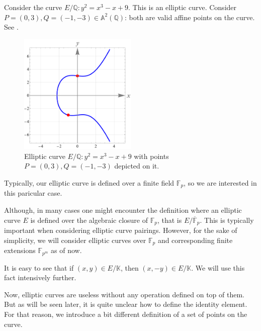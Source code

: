 \documentclass[../lecture-notes.tex]{subfiles}
\begin{document}
\begin{example}
    Consider the curve $E/\mathbb{Q}: y^2=x^3-x+9$. This is an elliptic curve. Consider $P=(0,3), Q=(-1,-3) \in \mathbb{A}^2(\mathbb{Q})$: both are valid affine points on the curve. See .

    \begin{figure}[H]
        \centering
        \includegraphics[width=0.5\textwidth]{images/lecture_3/ec_illustration_1.pdf}
        \caption{Elliptic curve $E/\mathbb{Q}: y^2=x^3-x+9$ with points $P=(0,3),Q=(-1,-3)$ depicted on it.}
        \label{fig:ec_1}
    \end{figure}
\end{example}

Typically, our elliptic curve is defined over a finite field $\mathbb{F}_p$, so we are interested in this paricular case. 

\begin{remark}
    Although, in many cases one might encounter the definition where an elliptic curve $E$ is defined over the algebraic closure of $\mathbb{F}_p$, that is $E/\overline{\mathbb{F}}_p$. This is typically important when considering elliptic curve pairings. However, for the sake of simplicity, we will consider elliptic curves over $\mathbb{F}_p$ and corresponding finite extensions $\mathbb{F}_{p^m}$ as of now.
\end{remark}

\begin{remark}
    It is easy to see that if $(x,y) \in E/\mathbb{K}$, then $(x,-y) \in E/\mathbb{K}$. We will use this fact intensively further.
\end{remark}

Now, elliptic curves are useless without any operation defined on top of them. But as will be seen later, it is quite unclear how to define the identity element. For that reason, we introduce a bit different definition of a set of points on the curve.
\end{document}
